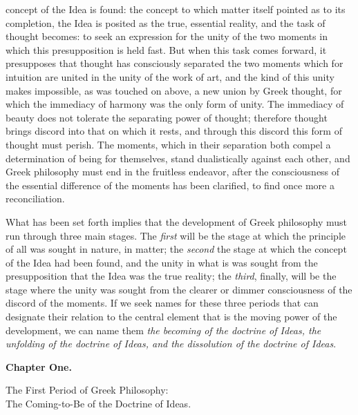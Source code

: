 concept of the Idea is found: the concept to which matter itself pointed as to
its completion, the Idea is posited as the true, essential reality, and the
task of thought becomes: to seek an expression for the unity of the two
moments in which this presupposition is held fast. But when this task comes
forward, it presupposes that thought has consciously separated the two
moments which for intuition are united in the unity of the work of art, and
the kind of this unity makes impossible, as was touched on above, a new union
by Greek thought, for which the immediacy of harmony was the only form of
unity. The immediacy of beauty does not tolerate the separating power of
thought; therefore thought brings discord into that on which it rests, and
through this discord this form of thought must perish. The moments, which in
their separation both compel a determination of being for themselves, stand
dualistically against each other, and Greek philosophy must end in the
fruitless endeavor, after the consciousness of the essential difference of the
moments has been clarified, to find once more a reconciliation.

What has been set forth implies that the development of Greek philosophy must
run through three main stages. The \emph{first} will be the stage at which the
principle of all was sought in nature, in matter; the \emph{second} the stage
at which the concept of the Idea had been found, and the unity in what is was
sought from the presupposition that the Idea was the true reality; the
\emph{third}, finally, will be the stage where the unity was sought from the
clearer or dimmer consciousness of the discord of the moments. If we seek
names for these three periods that can designate their relation to
the central element that is the moving power of the development, we can name
them \emph{the becoming of the doctrine of Ideas, the unfolding of the
doctrine of Ideas, and the dissolution of the doctrine of Ideas}.

\divrule

\begin{center}
{\Large\textbf{Chapter One.}}
\end{center}

\divrule

\begin{center}
{\Large The First Period of Greek Philosophy:\\
The Coming-to-Be of the Doctrine of Ideas.}
\end{center}

\divrule


